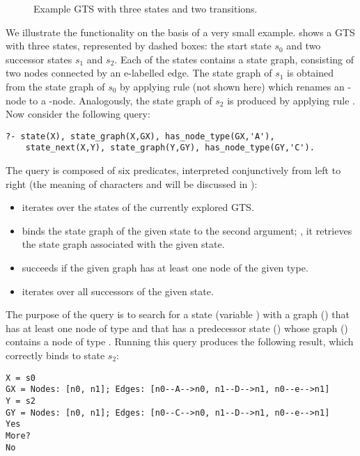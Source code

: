 \begin{figure}[t]
\centering
{}
\caption{Example GTS with three states and two transitions.}
\end{figure}

We illustrate the \Prolog functionality on the basis of a very small example.
 shows a GTS with three states, represented by dashed boxes: the
start state $s_0$ and two successor states $s_1$ and $s_2$. Each of the states
contains a state graph, consisting of two nodes connected by an
\textsf{e}-labelled edge. The state graph of $s_1$ is obtained from the state
graph of $s_0$ by applying rule  (not shown here) which renames an
-node to a -node. Analogously, the state graph of $s_2$ is
produced by applying rule . Now consider the following \Prolog query:
%
\begin{lstlisting}[style=prolog]
?- state(X), state_graph(X,GX), has_node_type(GX,'A'),
    state_next(X,Y), state_graph(Y,GY), has_node_type(GY,'C').
\end{lstlisting}
%
The query is composed of six predicates, interpreted conjunctively from left to
right (the meaning of characters \inPro{+} and  will be discussed in
):
%
\begin{itemize}\noitemsep\renewcommand{\labelitemi}{$\bullet$}
\item {} iterates over the states of the currently explored
GTS.
\item {} binds the state graph of the given
state to the second argument; \ie, it retrieves the state graph associated with
the given state.
\item {} succeeds if the given graph has
at least one node of the given type.
\item {} iterates over all successors of
the given state.
\end{itemize}
%
 The purpose of the query is to search for a state (variable ) with a
graph () that has at least one node of type  and that has a
predecessor state () whose graph () contains a node of type
. Running this query produces the following result, which correctly
binds  to state $s_2$:
%
\begin{lstlisting}[style=prolog]
X = s0
GX = Nodes: [n0, n1]; Edges: [n0--A-->n0, n1--D-->n1, n0--e-->n1]
Y = s2
GY = Nodes: [n0, n1]; Edges: [n0--C-->n0, n1--D-->n1, n0--e-->n1]
Yes
More?
No
\end{lstlisting}
